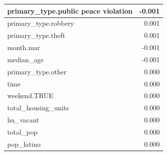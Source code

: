 \documentclass{ucetd}
\begin{document}
\begin{table}
\begin{tabular}[t]{l|r}
\hline
primary\_type.public peace violation & -0.001\\
\hline
primary\_type.robbery & 0.001\\
\hline
primary\_type.theft & 0.001\\
\hline
month.mar & -0.001\\
\hline
median\_age & -0.001\\
\hline
primary\_type.other & 0.000\\
\hline
time & 0.000\\
\hline
weekend.TRUE & 0.000\\
\hline
total\_housing\_units & 0.000\\
\hline
hu\_vacant & 0.000\\
\hline
total\_pop & 0.000\\
\hline
pop\_latino & 0.000\\
\hline
\end{tabular}
\end{table}
\end{document}
